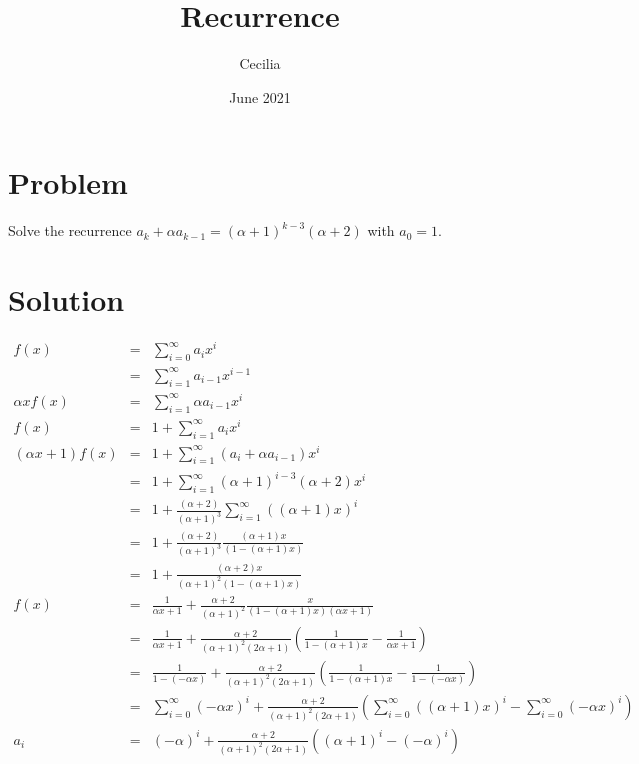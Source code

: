 \documentclass{article}
\title{Recurrence}
\author{Cecilia}
\date{June 2021}
\begin{document}
\maketitle

\section*{Problem}
Solve the recurrence $ a_k + \alpha a_{k-1} = (\alpha+1)^{k-3} (\alpha + 2) $ with $ a_0 = 1 $.

\section*{Solution}
\begin{eqnarray*}
                 f(x) &=& \sum\limits_{i=0}^{\infty} a_i x^i \\
                      &=& \sum\limits_{i=1}^{\infty} a_{i-1} x^{i-1} \\
        \alpha x f(x) &=& \sum\limits_{i=1}^{\infty} \alpha a_{i-1} x^i \\
                 f(x) &=& 1 + \sum\limits_{i=1}^{\infty} a_i x^i \\
  (\alpha x + 1) f(x) &=& 1 + \sum\limits_{i=1}^{\infty} (a_i + \alpha a_{i-1}) x^i \\
                      &=& 1 + \sum\limits_{i=1}^{\infty} (\alpha+1)^{i-3}(\alpha+2) x^i \\
                      &=& 1 + \frac{(\alpha+2)}{(\alpha+1)^3} \sum\limits_{i=1}^{\infty} ((\alpha+1)x)^i \\
                      &=& 1 + \frac{(\alpha+2)}{(\alpha+1)^3}\frac{(\alpha+1)x}{(1 - (\alpha+1)x)} \\
                      &=& 1 + \frac{(\alpha+2)x}{(\alpha+1)^2(1 - (\alpha+1)x)} \\
                 f(x) &=& \frac{1}{\alpha x + 1} + \frac{\alpha+2}{(\alpha+1)^2}\frac{x}{(1 - (\alpha+1)x)(\alpha x + 1)} \\
                      &=& \frac{1}{\alpha x + 1} + \frac{\alpha+2}{(\alpha+1)^2(2\alpha+1)}\left(\frac{1}{1 - (\alpha+1)x} - \frac{1}{\alpha x + 1}\right) \\
                      &=& \frac{1}{1 - (-\alpha x)} + \frac{\alpha+2}{(\alpha+1)^2(2\alpha+1)}\left(\frac{1}{1 - (\alpha+1)x} - \frac{1}{1 - (-\alpha x)}\right) \\
                      &=& \sum\limits_{i=0}^{\infty}(-\alpha x)^i + \frac{\alpha+2}{(\alpha+1)^2(2\alpha+1)}\left(\sum\limits_{i=0}^{\infty}((\alpha + 1)x)^i - \sum\limits_{i=0}^{\infty}(-\alpha x)^i\right) \\
                  a_i &=& (-\alpha)^i + \frac{\alpha+2}{(\alpha+1)^2(2\alpha+1)}\left((\alpha + 1)^i - (-\alpha)^i\right)
\end{eqnarray*}
\end{document}
